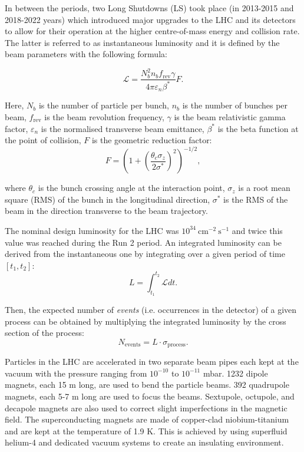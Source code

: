 In between the periods, two Long Shutdowns (LS) took place (in 2013-2015 and 2018-2022 years) which introduced major upgrades to the LHC and its detectors to allow for their operation at the higher centre-of-mass energy and collision rate. The latter is referred to as instantaneous luminosity and it is defined by the beam parameters with the following formula:  

\begin{equation}
    \mathcal{L} = \dfrac{N_b^2 n_b f_\text{rev} \gamma}{4\pi \varepsilon_n \beta^*}F.
\end{equation}

Here, $N_b$ is the number of particle per bunch, $n_b$ is the number of bunches per beam, $f_\text{rev}$ is the beam revolution frequency, $\gamma$ is the beam relativistic gamma factor, $\varepsilon_n$ is the normalised transverse beam emittance, $\beta^*$ is the beta function at the point of collision, $F$ is the geometric reduction factor:
\begin{equation}
    F = \left(1 + \left(\dfrac{\theta_c \sigma_z}{2\sigma^*}\right)^2\right)^{-1/2},
\end{equation}

where $\theta_c$ is the bunch crossing angle at the interaction point, $\sigma_z$ is a root mean square (RMS) of the bunch in the longitudinal direction, $\sigma^*$ is the RMS of the beam in the direction transverse to the beam trajectory.  

The nominal design luminosity for the LHC was $10^{34} ~\text{cm}^{-2}~\text{s}^{-1}$ and twice this value was reached during the Run 2 period.  An integrated luminosity can be derived from the instantaneous one by integrating over a given period of time $[t_1, t_2]$:
\begin{equation}
L = \int_{t_1}^{t_2} \mathcal{L}dt.
\end{equation} 

Then, the expected number of \textit{events} (i.e. occurrences in the detector) of a given process can be obtained by multiplying the integrated luminosity by the cross section of the process:
\begin{equation}
    N_\text{events} = L \cdot \sigma_\text{process}.
\end{equation}

Particles in the LHC are accelerated in two separate beam pipes each kept at the vacuum with the pressure ranging from $10^{-10}$ to $10^{-11}$ mbar. 1232 dipole magnets, each 15 m long, are used to bend the particle beams. 392 quadrupole magnets, each 5-7 m long are used to focus the beams. Sextupole, octupole, and decapole magnets are also used to correct slight imperfections in the magnetic field. The superconducting magnets are made of copper-clad niobium-titanium and are kept at the temperature of 1.9 K. This is achieved by using superfluid helium-4 and dedicated vacuum systems to create an insulating environment.   

